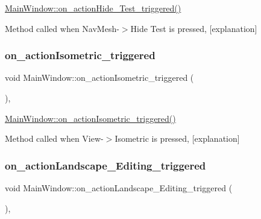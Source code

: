 \hyperlink{class_main_window_ac7fa56ba40ceb9eabb87920a65ff78d8}{Main\+Window\+::on\+\_\+action\+Hide\+\_\+\+Test\+\_\+triggered()} 

Method called when Nav\+Mesh-\/$>$Hide Test is pressed, \mbox{[}explanation\mbox{]} \mbox{\label{class_main_window_a9a1c4d7a462288215d815f7b6c87f7c1}} 
\subsubsection{\texorpdfstring{on\+\_\+action\+Isometric\+\_\+triggered}{on\_actionIsometric\_triggered}}
{\footnotesize\ttfamily void Main\+Window\+::on\+\_\+action\+Isometric\+\_\+triggered (\begin{DoxyParamCaption}{ }\end{DoxyParamCaption})\hspace{0.3cm}{\ttfamily [private]}, {\ttfamily [slot]}}



\hyperlink{class_main_window_a9a1c4d7a462288215d815f7b6c87f7c1}{Main\+Window\+::on\+\_\+action\+Isometric\+\_\+triggered()} 

Method called when View-\/$>$Isometric is pressed, \mbox{[}explanation\mbox{]} \mbox{\label{class_main_window_a80757bcc5466819ce28ceb0e7840a2eb}} 
\subsubsection{\texorpdfstring{on\+\_\+action\+Landscape\+\_\+\+Editing\+\_\+triggered}{on\_actionLandscape\_Editing\_triggered}}
{\footnotesize\ttfamily void Main\+Window\+::on\+\_\+action\+Landscape\+\_\+\+Editing\+\_\+triggered (\begin{DoxyParamCaption}{ }\end{DoxyParamCaption})\hspace{0.3cm}{\ttfamily [private]}, {\ttfamily [slot]}}



